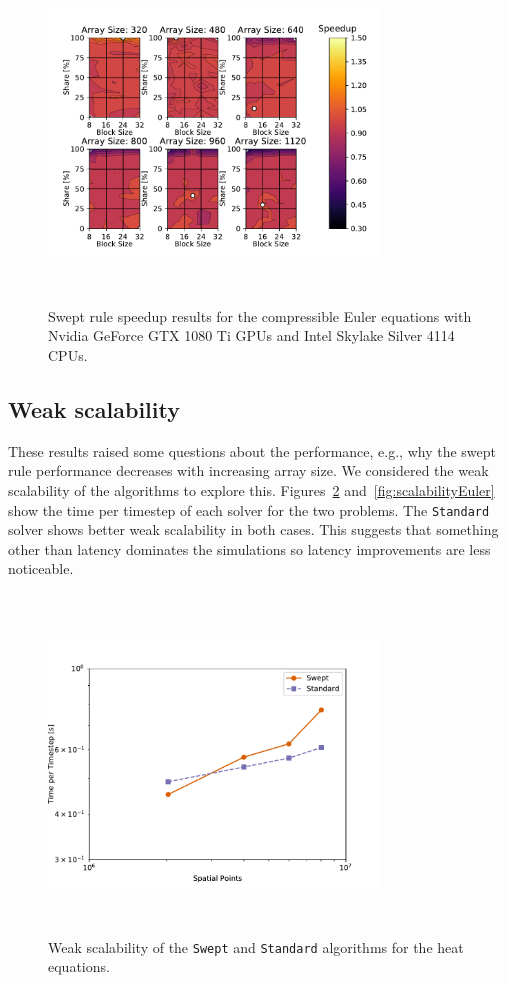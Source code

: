 \documentclass[preprints,article,accept,moreauthors,pdftex]{Definitions/mdpi}
\def\Swept{\texttt{Swept}}
\def\Standard{\texttt{Standard}}
\def\oldCPU{Intel Skylake Silver 4114} %
\def\oldGPU{Nvidia GeForce GTX 1080 Ti}
\begin{document}
\begin{figure}[htbp]
    \centering
    \includegraphics[height=9cm,width=0.78\textwidth, trim={0.75cm 0.4cm 0.8cm 0.7cm},clip]{figs/speedUpeulerOld.pdf}
    \caption{Swept rule speedup results  for the compressible Euler equations with \oldGPU{} GPUs and \oldCPU{} CPUs.}
    \label{fig:oldSpeedupEuler}
\end{figure}


\subsection{Weak scalability}

These results raised some questions about the performance, e.g., why the swept rule performance decreases with increasing array size. We considered the weak scalability of the algorithms to explore this. Figures~\ref{fig:scalabilityHeat} and~\ref{fig:scalabilityEuler} show the time per timestep of each solver for the two problems. 
The \Standard{} solver shows better weak scalability in both cases. This suggests that something other than latency dominates the simulations so latency improvements are less noticeable.

\begin{figure}[htbp]
    \centering
    \includegraphics[height=9cm,width=0.78\textwidth, trim={0cm 0.75cm 1cm 1.25cm},clip]{figs/weakScalabilityHeat.pdf}
    \caption{Weak scalability of the \Swept{} and \Standard{} algorithms for the heat equations.}
    \label{fig:scalabilityHeat}
\end{figure}
\end{document}
